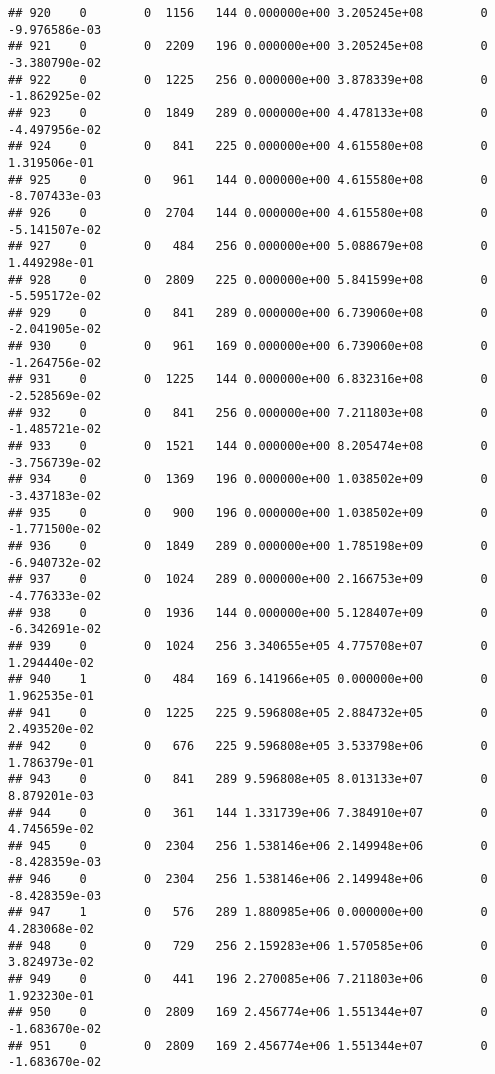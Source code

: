 \documentclass[
]{article}
\begin{document}
\begin{enumerate}
\begin{verbatim}
## 920    0        0  1156   144 0.000000e+00 3.205245e+08        0 -9.976586e-03
## 921    0        0  2209   196 0.000000e+00 3.205245e+08        0 -3.380790e-02
## 922    0        0  1225   256 0.000000e+00 3.878339e+08        0 -1.862925e-02
## 923    0        0  1849   289 0.000000e+00 4.478133e+08        0 -4.497956e-02
## 924    0        0   841   225 0.000000e+00 4.615580e+08        0  1.319506e-01
## 925    0        0   961   144 0.000000e+00 4.615580e+08        0 -8.707433e-03
## 926    0        0  2704   144 0.000000e+00 4.615580e+08        0 -5.141507e-02
## 927    0        0   484   256 0.000000e+00 5.088679e+08        0  1.449298e-01
## 928    0        0  2809   225 0.000000e+00 5.841599e+08        0 -5.595172e-02
## 929    0        0   841   289 0.000000e+00 6.739060e+08        0 -2.041905e-02
## 930    0        0   961   169 0.000000e+00 6.739060e+08        0 -1.264756e-02
## 931    0        0  1225   144 0.000000e+00 6.832316e+08        0 -2.528569e-02
## 932    0        0   841   256 0.000000e+00 7.211803e+08        0 -1.485721e-02
## 933    0        0  1521   144 0.000000e+00 8.205474e+08        0 -3.756739e-02
## 934    0        0  1369   196 0.000000e+00 1.038502e+09        0 -3.437183e-02
## 935    0        0   900   196 0.000000e+00 1.038502e+09        0 -1.771500e-02
## 936    0        0  1849   289 0.000000e+00 1.785198e+09        0 -6.940732e-02
## 937    0        0  1024   289 0.000000e+00 2.166753e+09        0 -4.776333e-02
## 938    0        0  1936   144 0.000000e+00 5.128407e+09        0 -6.342691e-02
## 939    0        0  1024   256 3.340655e+05 4.775708e+07        0  1.294440e-02
## 940    1        0   484   169 6.141966e+05 0.000000e+00        0  1.962535e-01
## 941    0        0  1225   225 9.596808e+05 2.884732e+05        0  2.493520e-02
## 942    0        0   676   225 9.596808e+05 3.533798e+06        0  1.786379e-01
## 943    0        0   841   289 9.596808e+05 8.013133e+07        0  8.879201e-03
## 944    0        0   361   144 1.331739e+06 7.384910e+07        0  4.745659e-02
## 945    0        0  2304   256 1.538146e+06 2.149948e+06        0 -8.428359e-03
## 946    0        0  2304   256 1.538146e+06 2.149948e+06        0 -8.428359e-03
## 947    1        0   576   289 1.880985e+06 0.000000e+00        0  4.283068e-02
## 948    0        0   729   256 2.159283e+06 1.570585e+06        0  3.824973e-02
## 949    0        0   441   196 2.270085e+06 7.211803e+06        0  1.923230e-01
## 950    0        0  2809   169 2.456774e+06 1.551344e+07        0 -1.683670e-02
## 951    0        0  2809   169 2.456774e+06 1.551344e+07        0 -1.683670e-02

\end{verbatim}
\end{enumerate}
\end{document}
